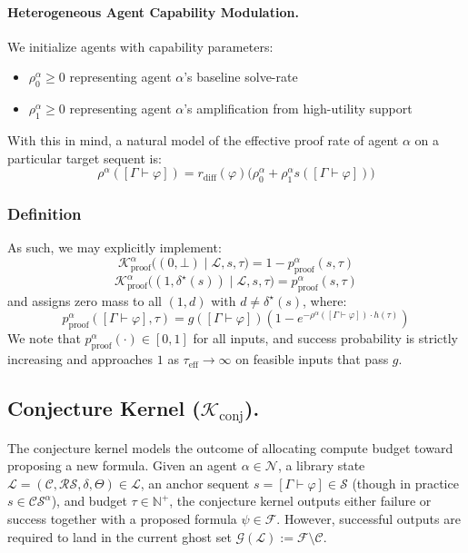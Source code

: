 \documentclass[letterpaper]{article} %
\renewcommand{\phi}{\varphi}
\newcommand{\proves}{\vdash}
\begin{document}
\paragraph{Heterogeneous Agent Capability Modulation.} We initialize agents with capability parameters:
\begin{itemize}
    \item $\rho_0^\alpha\ge 0$ representing agent $\alpha$'s baseline solve-rate
	\item $\rho_1^\alpha\ge 0$ representing agent $\alpha$'s amplification from high-utility support
\end{itemize}
With this in mind, a natural model of the effective proof rate of agent $\alpha$ on a particular target sequent is:
\[
\rho^\alpha([\Gamma \proves \phi])=r_\mathrm{diff}(\phi)\Big(\rho_0^\alpha + \rho_1^\alpha s([\Gamma \proves \phi])\Big)
\]

\subsubsection{Definition}

As such, we may explicitly implement:
\[
\mathcal K^\alpha_{\mathrm{proof}}\big((0,\bot)\mid \mathcal{L}, s,\tau\big)=1-p^\alpha_{\mathrm{proof}}(s,\tau)\]
\[\mathcal K^\alpha_{\mathrm{proof}}\big((1,\delta^\star(s))\mid \mathcal{L}, s,\tau\big)=p^\alpha_{\mathrm{proof}}(s,\tau)
\]
and assigns zero mass to all $(1,d)$ with $d\neq \delta^\star(s)$, where:
\[
p_{\text{proof}}^\alpha([\Gamma \proves \phi],\tau)=g([\Gamma \proves \phi])\left(1-e^{-\rho^\alpha([\Gamma \proves \phi])\cdot h(\tau)}\right)
\]
We note that $p_{\text{proof}}^\alpha(\cdot)\in[0,1]$ for all inputs, and success probability is strictly increasing and approaches $1$ as $\tau_{\mathrm{eff}}\to\infty$ on feasible inputs that pass $g$.

\subsection{Conjecture Kernel ($\mathcal{K}_{\text{conj}}$).}
The conjecture kernel models the outcome of allocating compute budget toward proposing a new formula. Given an agent $\alpha\in\mathcal N$, a library state $\mathcal L=(\mathcal C,\mathcal{RS},\delta,\Theta)\in\mathscr L$, an anchor sequent $s=[\Gamma\proves\phi]\in\mathcal S$ (though in practice $s\in\mathcal{CS}^\alpha$), and budget $\tau\in\mathbb N^+$, the conjecture kernel outputs either failure or success together with a proposed formula $\psi\in\mathcal F$. However, successful outputs are required to land in the current ghost set $\mathcal G(\mathcal{L}) :=\mathcal F\setminus \mathcal C$.
\end{document}
